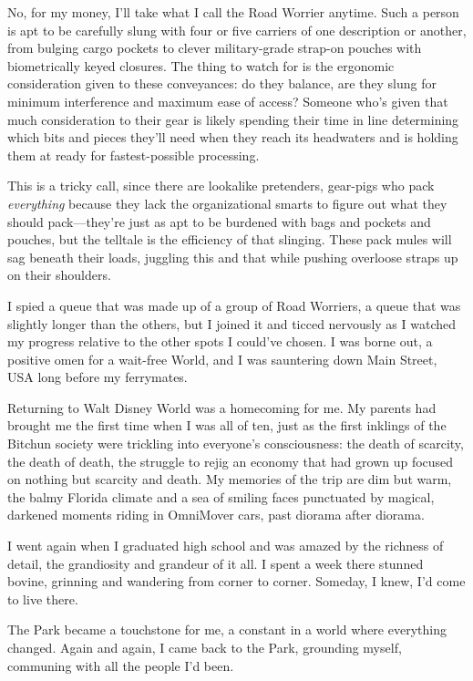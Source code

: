 No, for my money, I'll take what I call the Road Worrier anytime.
Such a person is apt to be carefully slung with four or five
carriers of one description or another, from bulging cargo pockets
to clever military-grade strap-on pouches with biometrically keyed
closures. The thing to watch for is the ergonomic consideration
given to these conveyances: do they balance, are they slung for
minimum interference and maximum ease of access? Someone who's
given that much consideration to their gear is likely spending
their time in line determining which bits and pieces they'll need
when they reach its headwaters and is holding them at ready for
fastest-possible processing.

This is a tricky call, since there are lookalike pretenders,
gear-pigs who pack \emph{everything} because they lack the
organizational smarts to figure out what they should pack—they're
just as apt to be burdened with bags and pockets and pouches, but
the telltale is the efficiency of that slinging. These pack mules
will sag beneath their loads, juggling this and that while pushing
overloose straps up on their shoulders.

I spied a queue that was made up of a group of Road Worriers, a
queue that was slightly longer than the others, but I joined it and
ticced nervously as I watched my progress relative to the other
spots I could've chosen. I was borne out, a positive omen for a
wait-free World, and I was sauntering down Main Street, USA long
before my ferrymates.

Returning to Walt Disney World was a homecoming for me. My parents
had brought me the first time when I was all of ten, just as the
first inklings of the Bitchun society were trickling into
everyone's consciousness: the death of scarcity, the death of
death, the struggle to rejig an economy that had grown up focused
on nothing but scarcity and death. My memories of the trip are dim
but warm, the balmy Florida climate and a sea of smiling faces
punctuated by magical, darkened moments riding in OmniMover cars,
past diorama after diorama.

I went again when I graduated high school and was amazed by the
richness of detail, the grandiosity and grandeur of it all. I spent
a week there stunned bovine, grinning and wandering from corner to
corner. Someday, I knew, I'd come to live there.

The Park became a touchstone for me, a constant in a world where
everything changed. Again and again, I came back to the Park,
grounding myself, communing with all the people I'd been.

